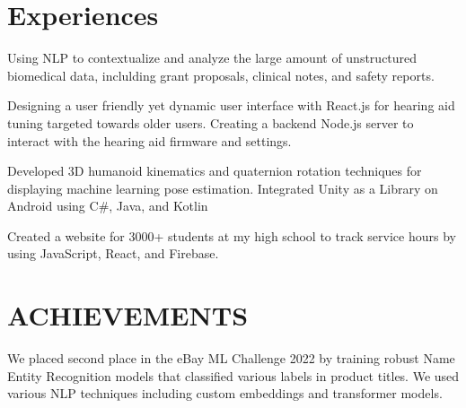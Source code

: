 \documentclass[]{main}
\begin{document}
\begin{minipage}[t]{0.66\textwidth} 

\section{Experiences}

Using NLP to contextualize and analyze the large amount of unstructured biomedical data, inclulding grant proposals, clinical notes, and safety reports.

\sectionsep


Designing a user friendly yet dynamic user interface with React.js for hearing aid tuning targeted towards older users. Creating a backend Node.js server to interact with the hearing aid firmware and settings.

\sectionsep

Developed 3D humanoid kinematics and quaternion rotation techniques
for displaying machine learning pose estimation.
Integrated Unity as a Library on Android using C\#, Java, and Kotlin
\sectionsep

Created a website for 3000+ students at my high school to track service hours by using JavaScript, React, and Firebase.

\sectionsep


\section{ACHIEVEMENTS}

We placed second place in the eBay ML Challenge 2022 by training robust Name Entity Recognition models that classified various labels in product titles. We used various NLP techniques including custom embeddings and transformer models.
\sectionsep


\end{minipage}
\end{document}
